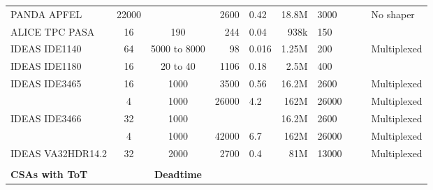 \documentclass[../main/thesis.tex]{subfiles}
\begin{document}
\begin{sidewaystable}[h!]
\begin{center}
{\begin{tabular}{lccrlrllll}
				PANDA APFEL                       & 22000    &                       & 2600         & 0.42     & 18.8M                  & 3000     &                & \citep{panda}                  & No shaper        \\
				ALICE TPC PASA                    & 16       & 190                   & 244          & 0.04     & 938k                   & 150      &                & \citep{pasa}                   &                  \\
				IDEAS IDE1140                     & 64       & 5000 to 8000          & 98           & 0.016    & 1.25M                  & 200      &                & \citep{ideasweb}               & Multiplexed      \\
				IDEAS IDE1180                     & 16       & 20 to 40              & 1106         & 0.18     & 2.5M                   & 400      &                & \citep{IDE1180}                &                  \\
				IDEAS IDE3465                     & 16       & 1000                  & 3500         & 0.56     & 16.2M                  & 2600     &                & \citep{ideasweb}               & Multiplexed      \\
				& 4        & 1000                  & 26000        & 4.2      & 162M                   & 26000    &                &                                  & Multiplexed      \\
				IDEAS IDE3466           & 32       & 1000                  &              &          & 16.2M                  & 2600     &                & \citep{ideasweb}               & Multiplexed      \\
				& 4        & 1000                  & 42000        & 6.7      & 162M                   & 26000    &                &                                  & Multiplexed      \\
				IDEAS VA32HDR14.2                 & 32       & 2000                  & 2700         & 0.4      & 81M                    & 13000    &                & \citep{ideasweb}               & Multiplexed      \\
				&          &                       &              &          &                        &          &                &                                  &                  \\
				\textbf{CSAs with ToT}     &          & \textbf{Deadtime}              &              &          &                        &          &                &                                  &                  \\ \midrule

\end{tabular}}
\end{center}
\end{sidewaystable}
\end{document}
